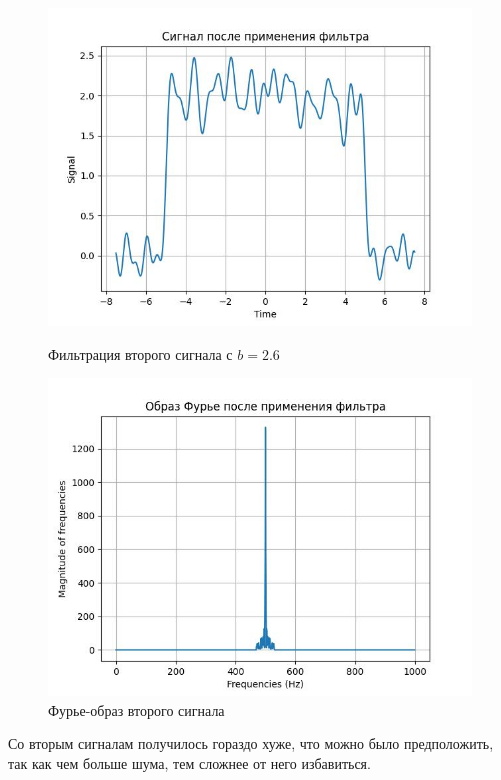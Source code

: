     \begin{figure}[!htb]
        \includegraphics[width=\linewidth]{../images/result/high_freq2.jpeg}
        \caption{Фильтрация второго сигнала с $b = 2.6$}
      \endminipage\hfill
        \includegraphics[width=\linewidth]{../images/result/high_freq2_fourier.jpeg}
        \caption{Фурье-образ второго сигнала}
      \endminipage\hfill
      \end{figure}

    \noindent Со вторым сигналам получилось гораздо хуже, что можно было предположить, так как чем больше шума, тем сложнее от него избавиться.
